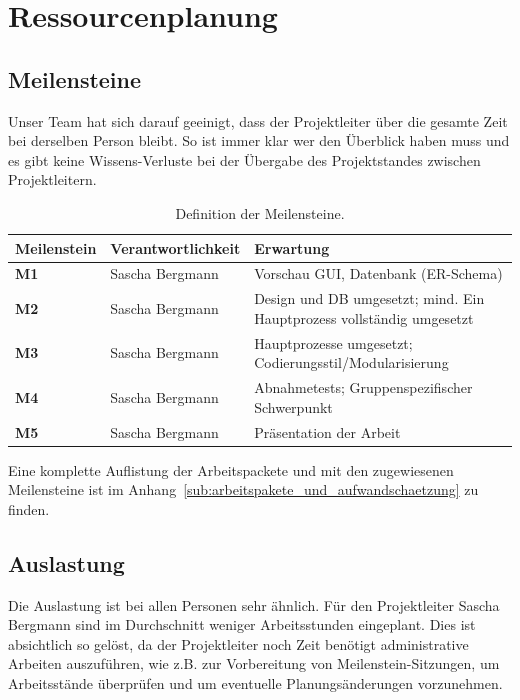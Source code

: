 \section{Ressourcenplanung}
\subsection{Meilensteine}
Unser Team hat sich darauf geeinigt, dass der Projektleiter über die gesamte Zeit bei derselben Person bleibt.
So ist immer klar wer den Überblick haben muss und es gibt keine Wissens-Verluste bei der Übergabe des Projektstandes zwischen Projektleitern.\\

\begin{table}[H]
\centering
\begin{tabularx}{\textwidth-1cm}{|l|l|X|} \hline
\textbf{Meilenstein}	& \textbf{Verantwortlichkeit} &	\textbf{Erwartung} \\ \hline
\textbf{M1}	&Sascha Bergmann	&Vorschau GUI, Datenbank (ER-Schema) \\  \hline
\textbf{M2}	&Sascha Bergmann	&Design und DB umgesetzt; mind. Ein Hauptprozess vollständig umgesetzt \\ \hline
\textbf{M3}	&Sascha Bergmann	&Hauptprozesse umgesetzt; Codierungsstil/Modularisierung \\ \hline
\textbf{M4}	&Sascha Bergmann	&Abnahmetests; Gruppenspezifischer Schwerpunkt \\ \hline
\textbf{M5}	&Sascha Bergmann	&Präsentation der Arbeit \\ \hline
\end{tabularx}
\caption{Definition der Meilensteine.}
\end{table}

Eine komplette Auflistung der Arbeitspackete und mit den zugewiesenen Meilensteine ist im Anhang~\ref{sub:arbeitspakete_und_aufwandschaetzung} zu finden.  

\subsection{Auslastung}
Die Auslastung ist bei allen Personen sehr ähnlich. Für den Projektleiter Sascha Bergmann sind im Durchschnitt weniger Arbeitsstunden eingeplant. Dies ist absichtlich so gelöst, da der Projektleiter noch Zeit benötigt administrative Arbeiten auszuführen, wie z.B. zur Vorbereitung von Meilenstein-Sitzungen, um Arbeitsstände überprüfen und um eventuelle Planungsänderungen vorzunehmen.

